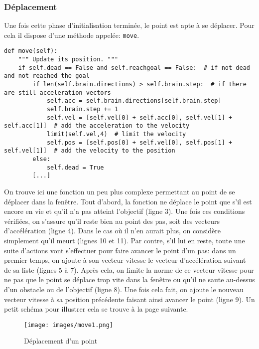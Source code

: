 \documentclass[12pt, a4paper, openany]{book}
\begin{document}
\subsubsection{Déplacement}
Une fois cette phase d'initialisation terminée, le point est apte à se déplacer. Pour cela il dispose d'une méthode appelée: \verb'move'.
\begin{verbatim}
def move(self):
	""" Update its position. """
	if self.dead == False and self.reachgoal == False:  # if not dead and not reached the goal
		if len(self.brain.directions) > self.brain.step:  # if there are still acceleration vectors
			self.acc = self.brain.directions[self.brain.step]
			self.brain.step += 1
			self.vel = [self.vel[0] + self.acc[0], self.vel[1] + self.acc[1]]  # add the acceleration to the velocity
			limit(self.vel,4)  # limit the velocity
			self.pos = [self.pos[0] + self.vel[0], self.pos[1] + self.vel[1]]  # add the velocity to the position
		else:
			self.dead = True
		[...]
\end{verbatim}
On trouve ici une fonction un peu plus complexe permettant au point de se déplacer dans la fenêtre. Tout d'abord, la fonction ne déplace le point que s'il est encore en vie et qu'il n'a pas atteint l'objectif (ligne 3). Une fois ces conditions vérifiées, on s'assure qu'il reste bien au point des \og pas\fg{}, soit des vecteurs d'accélération (ligne 4). Dans le cas où il n'en aurait plus, on considère simplement qu'il \og meurt\fg{} (lignes 10 et 11). Par contre, s'il lui en reste, toute une suite d'actions vont s'effectuer pour faire avancer le point d'un \og pas\fg{}: dans un premier temps, on ajoute à son vecteur vitesse le vecteur d'accélération suivant de sa liste (lignes 5 à 7). Après cela, on limite la norme de ce vecteur vitesse pour ne pas que le point se déplace trop vite dans la fenêtre ou qu'il ne \og saute\fg{} au-dessus d'un obstacle ou de l'objectif (ligne 8). Une fois cela fait, on ajoute le nouveau vecteur vitesse à sa position précédente faisant ainsi avancer le point (ligne 9). Un petit schéma pour illustrer cela se trouve à la page suivante.
\begin{figure}[H]
    \centering
    \texttt{[image: images/move1.png]}
    \caption{Déplacement d'un point}
\end{figure}
\end{document}

